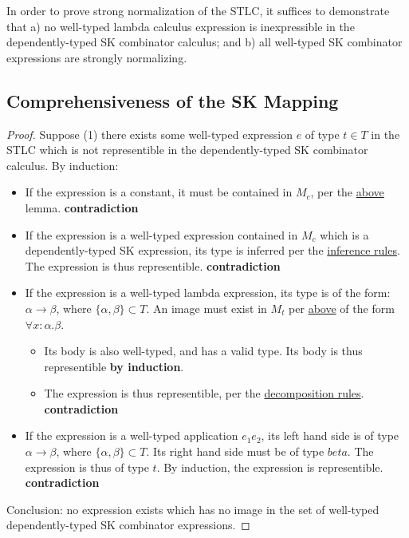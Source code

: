 \documentclass[11pt]{article}
\begin{document}
In order to prove strong normalization of the STLC, it suffices to demonstrate that a) no well-typed lambda calculus expression is inexpressible in the dependently-typed SK combinator calculus; and b) all well-typed SK combinator expressions are strongly normalizing.
\subsection{Comprehensiveness of the SK Mapping}
\label{sec:org3fd59b8}

\begin{proof}
Suppose (1) there exists some well-typed expression $e$ of type $t \in T$ in the STLC which is not representible in the dependently-typed SK combinator calculus. By induction: \\
\begin{itemize}
\item{If the expression is a constant, it must be contained in $M_{c}$, per the \href{maplemma:1}{above} lemma. \textbf{contradiction}} \\
\item{If the expression is a well-typed expression contained in $M_{c}$ which is a dependently-typed SK expression, its type is inferred per the \href{inference:1}{inference rules}. The expression is thus representible. \textbf{contradiction}} \\
\item If the expression is a well-typed lambda expression, its type is of the form: $\alpha \rightarrow \beta$, where $\{\alpha, \beta\} \subset T$. An image must exist in $M_{t}$ per \href{maplemma:1}{above} of the form $\forall x : \alpha.\beta$. \\
\begin{itemize}
  \item{Its body is also well-typed, and has a valid type. Its body is thus representible \textbf{by induction}.} \\
  \item{The expression is thus representible, per the \href{decomplemma:1}{decomposition rules}. \textbf{contradiction}} \\
\end{itemize}
\item{If the expression is a well-typed application $e_{1} e_{2}$, its left hand side is of type $\alpha \rightarrow \beta$, where $\{\alpha, \beta\} \subset T$. Its right hand side must be of type $beta$. The expression is thus of type $t$. By induction, the expression is representible. \textbf{contradiction}} \\
\end{itemize}

Conclusion: no expression exists which has no image in the set of well-typed dependently-typed SK combinator expressions.
\end{proof}
\end{document}
